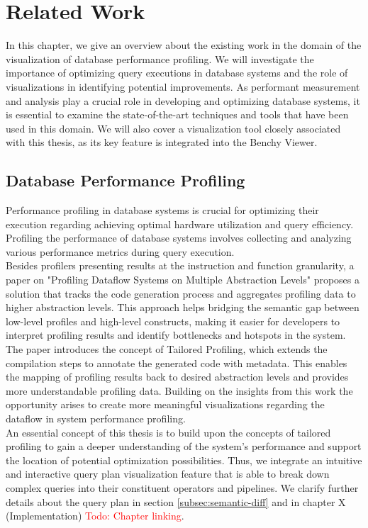 
\chapter{Related Work}\label{chapter:relatedWork}
In this chapter, we give an overview about the existing work in the domain of the visualization of database performance profiling.
We will investigate the importance of optimizing query executions in database systems and the role of visualizations in identifying potential improvements.
As performant measurement and analysis play a crucial role in developing and optimizing database systems, 
it is essential to examine the state-of-the-art techniques and tools that have been used in this domain.
We will also cover a visualization tool closely associated with this thesis, as its key feature is integrated into the Benchy Viewer.



\section{Database Performance Profiling }

Performance profiling in database systems is crucial for optimizing their execution regarding achieving optimal hardware utilization and query efficiency.
Profiling the performance of database systems involves collecting and analyzing various performance metrics during query execution.
\\Besides profilers presenting results at the instruction and function granularity, a paper on "Profiling Dataflow Systems on Multiple Abstraction Levels" \cite{profiling-dataflow} proposes a solution that tracks the code generation process and aggregates profiling data to higher abstraction levels. This approach helps bridging the semantic gap between low-level profiles and high-level constructs, making it easier for developers to interpret profiling results and identify bottlenecks and hotspots in the system. The paper introduces the concept of Tailored Profiling, which extends the compilation steps to annotate the generated code with metadata. This enables the mapping of profiling results back to desired abstraction levels and provides more understandable profiling data.
Building on the insights from this work the opportunity arises to create more meaningful visualizations regarding the dataflow in system performance profiling.
\\ An essential concept of this thesis is to build upon the concepts of tailored profiling to gain a deeper understanding of the system's performance and support the location of potential optimization possibilities. Thus, we integrate an intuitive and interactive query plan visualization feature that is able to break down complex queries into their constituent operators and pipelines. We clarify further details about the query plan in section \ref{subsec:semantic-diff} and in chapter X (Implementation) \textcolor{red}{Todo: Chapter linking}.

